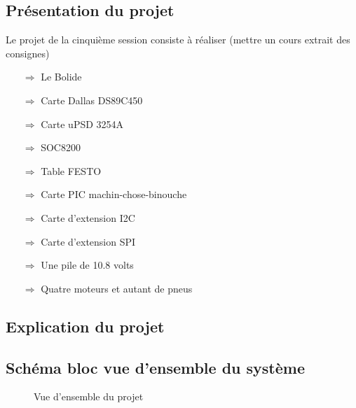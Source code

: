 \documentclass[10pt,a4paper,final]{article}
\begin{document}
\renewcommand\footrulewidth{1pt}
\fancyfoot[R]{\today}
\begin{spacing}{1.5}

\section{Présentation du projet}
Le projet de la cinquième session consiste à réaliser (mettre un cours extrait des consignes)
\begin{itemize}
\item[$\Rightarrow$] Le Bolide
\item[$\Rightarrow$] Carte Dallas DS89C450
\item[$\Rightarrow$] Carte uPSD 3254A
\item[$\Rightarrow$] SOC8200
\item[$\Rightarrow$] Table FESTO
\item[$\Rightarrow$] Carte PIC machin-chose-binouche
\item[$\Rightarrow$] Carte d'extension I{\small 2}C
\item[$\Rightarrow$] Carte d'extension SPI
\item[$\Rightarrow$] Une pile de 10.8 volts
\item[$\Rightarrow$] Quatre moteurs et autant de pneus
\end{itemize}

\subsection{Explication du projet}

\subsection{Schéma bloc vue d'ensemble du système}

\begin{figure}[hbtp]
\caption{Vue d'ensemble du projet}
\centering
{}
\end{figure}
\vfill
\pagebreak 


\end{spacing}
\end{document}
